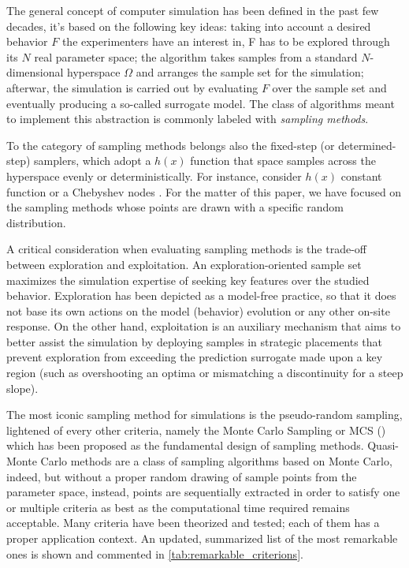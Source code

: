 \documentclass[12pt]{extarticle}
\begin{document}
The general concept of computer simulation has been defined in the past few decades, it's based on the following key ideas: taking into account a desired behavior $ F $ the experimenters have an interest in, F has to be explored through its $ N $ real parameter space; the algorithm takes samples from a standard $ N $-dimensional hyperspace $ \Omega $ and arranges the sample set for the simulation; afterwar, the simulation is carried out by evaluating $ F $ over the sample set and eventually producing a so-called surrogate model. The class of algorithms meant to implement this abstraction is commonly labeled with \textit{sampling methods}.

To the category of sampling methods belongs also the fixed-step (or determined-step) samplers, which adopt a $h(x)$ function that space samples across the hyperspace evenly or deterministically. For instance, consider $h(x)$ constant function or a Chebyshev nodes . For the matter of this paper, we have focused on the sampling methods whose points are drawn with a specific random distribution.

A critical consideration when evaluating sampling methods is the trade-off between exploration and exploitation. An exploration-oriented sample set maximizes the simulation expertise of seeking key features over the studied behavior. Exploration has been depicted as a model-free practice, so that it does not base its own actions on the model (behavior) evolution or any other on-site response. On the other hand, exploitation is an auxiliary mechanism that aims to better assist the simulation by deploying samples in strategic placements that prevent exploration from exceeding the prediction surrogate made upon a key region (such as overshooting an optima or mismatching a discontinuity for a steep slope).

The most iconic sampling method for simulations is the pseudo-random sampling, lightened of every other criteria, namely the Monte Carlo Sampling or MCS ()  which has been proposed as the fundamental design of sampling methods. Quasi-Monte Carlo methods are a class of sampling algorithms based on Monte Carlo, indeed, but without a proper random drawing of sample points from the parameter space, instead, points are sequentially extracted in order to satisfy one or multiple criteria as best as the computational time required remains acceptable. Many criteria have been theorized and tested; each of them has a proper application context. An updated, summarized list of the most remarkable ones is shown and commented in \cref{tab:remarkable_criterions}. 
\end{document}
